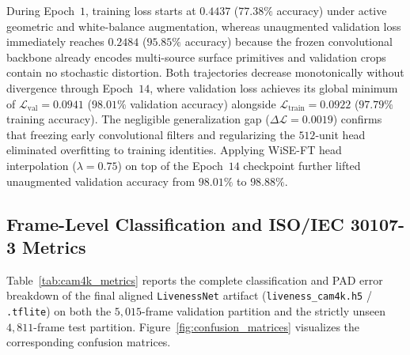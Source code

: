 During Epoch~$1$, training loss starts at $0.4437$ ($77.38\%$ accuracy) under active geometric and white-balance augmentation, whereas unaugmented validation loss immediately reaches $0.2484$ ($95.85\%$ accuracy) because the frozen convolutional backbone already encodes multi-source surface primitives and validation crops contain no stochastic distortion. Both trajectories decrease monotonically without divergence through Epoch~$14$, where validation loss achieves its global minimum of $\mathcal{L}_{\text{val}} = 0.0941$ ($98.01\%$ validation accuracy) alongside $\mathcal{L}_{\text{train}} = 0.0922$ ($97.79\%$ training accuracy). The negligible generalization gap ($\Delta\mathcal{L} = 0.0019$) confirms that freezing early convolutional filters and regularizing the $512$-unit head eliminated overfitting to training identities. Applying WiSE-FT head interpolation ($\lambda = 0.75$) on top of the Epoch~$14$ checkpoint further lifted unaugmented validation accuracy from $98.01\%$ to $98.88\%$.

\subsection{Frame-Level Classification and ISO/IEC 30107-3 Metrics}

Table~\ref{tab:cam4k_metrics} reports the complete classification and PAD error breakdown of the final aligned \texttt{LivenessNet} artifact (\texttt{liveness\_cam4k.h5} / \texttt{.tflite}) on both the $5{,}015$-frame validation partition and the strictly unseen $4{,}811$-frame test partition. Figure~\ref{fig:confusion_matrices} visualizes the corresponding confusion matrices.

